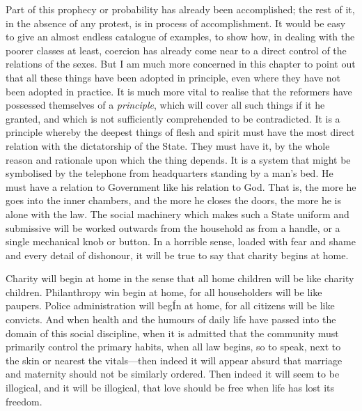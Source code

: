 \documentclass{book}
\begin{document}
Part of this prophecy or probability has already been accomplished; the rest of it, in the absence of any protest, is in process of accomplishment. It would be easy to give an almost endless catalogue of examples, to show how, in dealing with the poorer classes at least, coercion has already come near to a direct control of the relations of the sexes. But I am much more concerned in this chapter to point out that all these things have been adopted in principle, even where they have not been adopted in practice. It is much more vital to realise that the reformers have possessed themselves of a \emph{principle}, which will cover all such things if it he granted, and which is not sufficiently comprehended to be contradicted. It is a principle whereby the deepest things of flesh and spirit must have the most direct relation with the dictatorship of the State. They must have it, by the whole reason and rationale upon which the thing depends. It is a system that might be symbolised by the telephone from headquarters standing by a man’s bed. He must have a relation to Government like his relation to God. That is, the more he goes into the inner chambers, and the more he closes the doors, the more he is alone with the law. The social machinery which makes such a State uniform and submissive will be worked outwards from the household as from a handle, or a single mechanical knob or button. In a horrible sense, loaded with fear and shame and every detail of dishonour, it will be true to say that charity begins at home.

Charity will begin at home in the sense that all home children will be like charity children. Philanthropy win begin at home, for all householders will be like paupers. Police administration will begÍn at home, for all citizens will be like convicts. And when health and the humours of daily life have passed into the domain of this social discipline, when it is admitted that the community must primarily control the primary habits, when all law begins, so to speak, next to the skin or nearest the vitals—then indeed it will appear absurd that marriage and maternity should not be similarly ordered. Then indeed it will seem to be illogical, and it will be illogical, that love should be free when life has lost its freedom.
\end{document}
